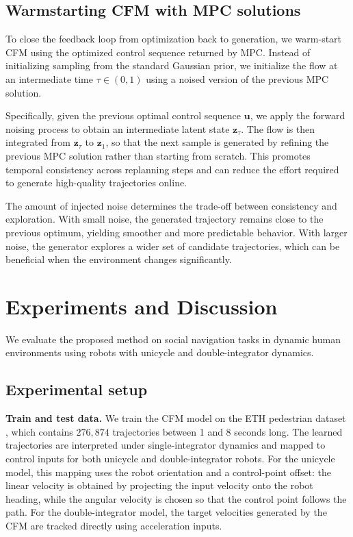 \documentclass[letterpaper,10 pt,conference]{ieeeconf}
\begin{document}
\subsection{Warmstarting CFM with MPC solutions}
To close the feedback loop from optimization back to generation, we warm-start CFM using the optimized control sequence returned by MPC. 
Instead of initializing sampling from the standard Gaussian prior, we initialize the flow at an intermediate time $\tau \in (0,1)$ using a noised version of the previous MPC solution.

Specifically, given the previous optimal control sequence $\mathbf{u}$, we apply the forward noising process to obtain an intermediate latent state $\mathbf{z}_\tau$. 
The flow is then integrated from $\mathbf{z}_\tau$ to $\mathbf{z}_1$, so that the next sample is generated by refining the previous MPC solution rather than starting from scratch. 
This promotes temporal consistency across replanning steps and can reduce the effort required to generate high-quality trajectories online.

The amount of injected noise determines the trade-off between consistency and exploration. 
With small noise, the generated trajectory remains close to the previous optimum, yielding smoother and more predictable behavior. 
With larger noise, the generator explores a wider set of candidate trajectories, which can be beneficial when the environment changes significantly.



\section{Experiments and Discussion} \label{sec:evaluation}

We evaluate the proposed method on social navigation tasks in dynamic human environments using robots with unicycle and double-integrator dynamics.

\subsection{Experimental setup} \label{subsec:settings}

\noindent\textbf{Train and test data.} 
We train the CFM model on the ETH pedestrian dataset \cite{PellegriniEssEtAl2009}, which contains $276{,}874$ trajectories between 1 and 8 seconds long.
The learned trajectories are interpreted under single-integrator dynamics and mapped to control inputs for both unicycle and double-integrator robots. 
For the unicycle model, this mapping uses the robot orientation and a control-point offset: the linear velocity is obtained by projecting the input velocity onto the robot heading, while the angular velocity is chosen so that the control point follows the path. 
For the double-integrator model, the target velocities generated by the CFM are tracked directly using acceleration inputs.
\end{document}

